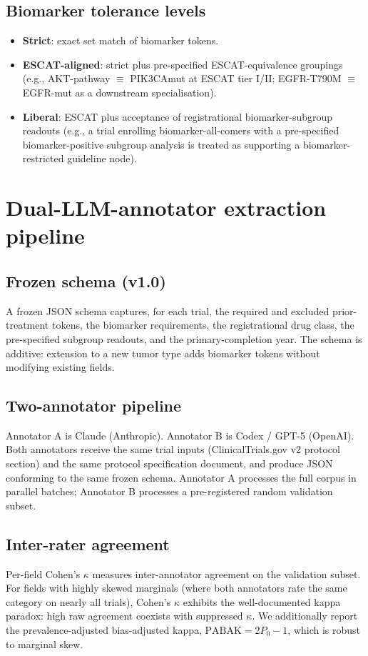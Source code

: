 \documentclass[11pt,a4paper]{article}
\begin{document}
\subsection{Biomarker tolerance levels}\label{sec:tolerance}
\begin{itemize}
\item \textbf{Strict}: exact set match of biomarker tokens.
\item \textbf{ESCAT-aligned}: strict plus pre-specified ESCAT-equivalence groupings\citep{mateo2018escat} (e.g., AKT-pathway $\equiv$ PIK3CAmut at ESCAT tier I/II; EGFR-T790M $\equiv$ EGFR-mut as a downstream specialisation).
\item \textbf{Liberal}: ESCAT plus acceptance of registrational biomarker-subgroup readouts (e.g., a trial enrolling biomarker-all-comers with a pre-specified biomarker-positive subgroup analysis is treated as supporting a biomarker-restricted guideline node).
\end{itemize}

\section{Dual-LLM-annotator extraction pipeline}\label{sec:llm}

\subsection{Frozen schema (v1.0)}
A frozen JSON schema captures, for each trial, the required and excluded prior-treatment tokens, the biomarker requirements, the registrational drug class, the pre-specified subgroup readouts, and the primary-completion year. The schema is additive: extension to a new tumor type adds biomarker tokens without modifying existing fields.

\subsection{Two-annotator pipeline}
Annotator A is Claude (Anthropic). Annotator B is Codex / GPT-5 (OpenAI). Both annotators receive the same trial inputs (ClinicalTrials.gov v2 protocol section) and the same protocol specification document, and produce JSON conforming to the same frozen schema. Annotator A processes the full corpus in parallel batches; Annotator B processes a pre-registered random validation subset.

\subsection{Inter-rater agreement}
Per-field Cohen's $\kappa$\citep{cohen1960kappa} measures inter-annotator agreement on the validation subset. For fields with highly skewed marginals (where both annotators rate the same category on nearly all trials), Cohen's $\kappa$ exhibits the well-documented kappa paradox: high raw agreement coexists with suppressed $\kappa$.\citep{viera2005} We additionally report the prevalence-adjusted bias-adjusted kappa, $\mathrm{PABAK} = 2 P_0 - 1$,\citep{byrt1993pabak} which is robust to marginal skew.
\end{document}
